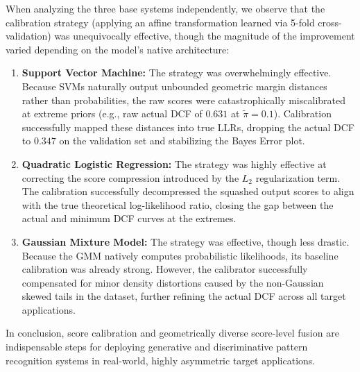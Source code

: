 When analyzing the three base systems independently, we observe that the calibration strategy (applying an affine transformation learned via 5-fold cross-validation) was unequivocally effective, though the magnitude of the improvement varied depending on the model's native architecture:

\begin{enumerate}
    \item \textbf{Support Vector Machine:} The strategy was overwhelmingly effective. Because SVMs naturally output unbounded geometric margin distances rather than probabilities, the raw scores were catastrophically miscalibrated at extreme priors (e.g., raw actual DCF of $0.631$ at $\tilde{\pi}=0.1$). Calibration successfully mapped these distances into true LLRs, dropping the actual DCF to $0.347$ on the validation set and stabilizing the Bayes Error plot.
    \item \textbf{Quadratic Logistic Regression:} The strategy was highly effective at correcting the score compression introduced by the $L_2$ regularization term. The calibration successfully decompressed the squashed output scores to align with the true theoretical log-likelihood ratio, closing the gap between the actual and minimum DCF curves at the extremes.
    \item \textbf{Gaussian Mixture Model:} The strategy was effective, though less drastic. Because the GMM natively computes probabilistic likelihoods, its baseline calibration was already strong. However, the calibrator successfully compensated for minor density distortions caused by the non-Gaussian skewed tails in the dataset, further refining the actual DCF across all target applications.
\end{enumerate}

In conclusion, score calibration and geometrically diverse score-level fusion are indispensable steps for deploying generative and discriminative pattern recognition systems in real-world, highly asymmetric target applications.
